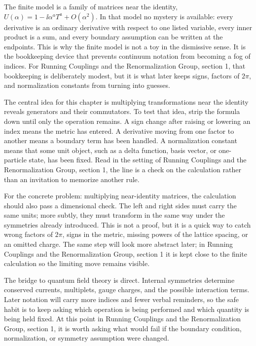 The finite model is a family of matrices near the identity, \(U(\alpha)=1-\ii\alpha^aT^a+O(\alpha^2)\).  In that model no mystery is available: every derivative is an ordinary derivative with respect to one listed variable, every inner product is a sum, and every boundary assumption can be written at the endpoints.  This is why the finite model is not a toy in the dismissive sense.  It is the bookkeeping device that prevents continuum notation from becoming a fog of indices.  For Running Couplings and the Renormalization Group, section 1, that bookkeeping is deliberately modest, but it is what later keeps signs, factors of \(2\pi\), and normalization constants from turning into guesses.

The central idea for this chapter is multiplying transformations near the identity reveals generators and their commutators.  To test that idea, strip the formula down until only the operation remains.  A sign change after raising or lowering an index means the metric has entered.  A derivative moving from one factor to another means a boundary term has been handled.  A normalization constant means that some unit object, such as a delta function, basis vector, or one-particle state, has been fixed.  Read in the setting of Running Couplings and the Renormalization Group, section 1, the line is a check on the calculation rather than an invitation to memorize another rule.

For the concrete problem: multiplying near-identity matrices, the calculation should also pass a dimensional check.  The left and right sides must carry the same units; more subtly, they must transform in the same way under the symmetries already introduced.  This is not a proof, but it is a quick way to catch wrong factors of \(2\pi\), signs in the metric, missing powers of the lattice spacing, or an omitted charge.  The same step will look more abstract later; in Running Couplings and the Renormalization Group, section 1 it is kept close to the finite calculation so the limiting move remains visible.

The bridge to quantum field theory is direct.  Internal symmetries determine conserved currents, multiplets, gauge charges, and the possible interaction terms.  Later notation will carry more indices and fewer verbal reminders, so the safe habit is to keep asking which operation is being performed and which quantity is being held fixed.  At this point in Running Couplings and the Renormalization Group, section 1, it is worth asking what would fail if the boundary condition, normalization, or symmetry assumption were changed.

